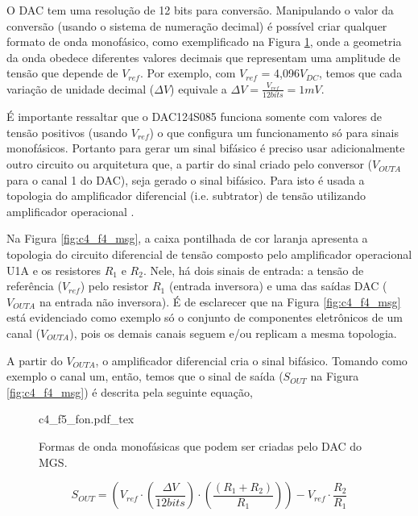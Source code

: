 O \acrshort{DAC} tem uma resolução de 12 bits para conversão. Manipulando o valor da conversão (usando o sistema de numeração decimal) é possível criar qualquer formato de onda monofásico, como exemplificado na Figura \ref{fig:c4_f5_fon}, onde a geometria da onda obedece diferentes valores decimais que representam uma amplitude de tensão que depende de $V_{ref}$. Por exemplo, com $V_{ref}$ = 4,096$V_{DC}$, temos que cada variação de unidade decimal ($\Delta V$) equivale a $\Delta V= \frac{V_{ref}}{12bits}=1mV$.

É importante ressaltar que o DAC124S085 funciona somente com valores de tensão positivos (usando $V_{ref}$) o que configura um funcionamento só para sinais monofásicos. Portanto para gerar um sinal bifásico é preciso usar adicionalmente outro circuito ou arquitetura que, a partir do sinal criado pelo conversor ($V_{OUTA}$ para o canal 1 do \acrshort{DAC}), seja gerado o sinal bifásico. Para isto é usada a topologia do amplificador diferencial (i.e. subtrator) de tensão utilizando amplificador operacional \cite{Jung2005OpHandbook, Carter2001HandbookApplications}. 

Na Figura \ref{fig:c4_f4_msg}, a caixa pontilhada de cor laranja apresenta a topologia do circuito diferencial de tensão composto pelo amplificador operacional U1A e os resistores $R_1$ e $R_2$. Nele, há dois sinais de entrada: a tensão de referência ($V_{ref}$) pelo resistor $R_1$ (entrada inversora) e uma das saídas \acrshort{DAC} ($V_{OUTA}$ na entrada não inversora). É de esclarecer que na Figura \ref{fig:c4_f4_msg} está evidenciado como exemplo só o conjunto de componentes eletrônicos de um canal ($V_{OUTA}$), pois os demais canais seguem e/ou replicam a mesma topologia. 

A partir do $V_{OUTA}$, o amplificador diferencial cria o sinal bifásico. Tomando como exemplo o canal um, então, temos que o sinal de saída ($S_{OUT}$ na Figura \ref{fig:c4_f4_msg}) é descrita pela seguinte equação,

\begin{figure}[h]
    \centering %
    \small %
    \def\svgwidth{1\columnwidth}%
    {c4_f5_fon.pdf_tex}
    \caption{Formas de onda monofásicas que podem ser criadas pelo \acrshort{DAC} do \acrshort{MGS}.}
    \label{fig:c4_f5_fon}
\end{figure}

\begin{equation}
    S_{OUT} =\left(V_{ref} \cdot \left(\frac{\Delta V}{12bits}\right)\cdot\left(\frac{(R_1 + R_2)}{R_1}\right)\right)- V_{ref}\cdot\frac{R_2}{R_1}
    \label{eq:c4_1}
\end{equation}

